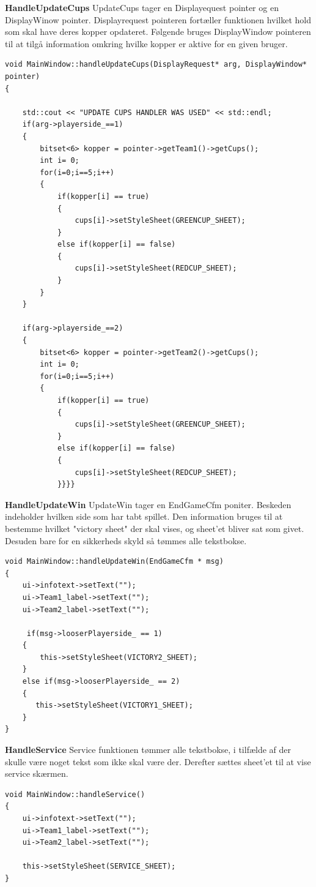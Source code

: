 \documentclass[Softwaredesign/Softwaredesign_main.tex]{subfiles}
\begin{document}
\textbf{HandleUpdateCups}
UpdateCups tager en Displayequest pointer og en DisplayWinow pointer. Displayrequest pointeren fortæller funktionen hvilket hold som skal have deres kopper opdateret. Følgende bruges DisplayWindow pointeren til at tilgå information omkring hvilke kopper er aktive for en given bruger. 
\begin{verbatim}
void MainWindow::handleUpdateCups(DisplayRequest* arg, DisplayWindow* pointer)
{

    std::cout << "UPDATE CUPS HANDLER WAS USED" << std::endl;
    if(arg->playerside_==1)
    {
        bitset<6> kopper = pointer->getTeam1()->getCups();
        int i= 0;
        for(i=0;i==5;i++)
        {
            if(kopper[i] == true)
            {
                cups[i]->setStyleSheet(GREENCUP_SHEET);
            }
            else if(kopper[i] == false)
            {
                cups[i]->setStyleSheet(REDCUP_SHEET);
            }
        }
    }

    if(arg->playerside_==2)
    {
        bitset<6> kopper = pointer->getTeam2()->getCups();
        int i= 0;
        for(i=0;i==5;i++)
        {
            if(kopper[i] == true)
            {
                cups[i]->setStyleSheet(GREENCUP_SHEET);
            }
            else if(kopper[i] == false)
            {
                cups[i]->setStyleSheet(REDCUP_SHEET);
            }}}}
\end{verbatim}


\textbf{HandleUpdateWin}
UpdateWin tager en EndGameCfm poniter. Beskeden indeholder hvilken side som har tabt spillet.  Den information bruges til at bestemme hvilket "victory sheet" der skal vises, og sheet'et bliver sat som givet. Desuden bare for en sikkerheds skyld så tømmes alle tekstbokse.
\begin{verbatim}
void MainWindow::handleUpdateWin(EndGameCfm * msg)
{
    ui->infotext->setText("");
    ui->Team1_label->setText("");
    ui->Team2_label->setText("");

     if(msg->looserPlayerside_ == 1)
    {
        this->setStyleSheet(VICTORY2_SHEET);
    }
    else if(msg->looserPlayerside_ == 2)
    {
       this->setStyleSheet(VICTORY1_SHEET);
    }
}
\end{verbatim}


\textbf{HandleService}
Service funktionen tømmer alle tekstbokse,  i tilfælde af der skulle være noget tekst som ikke skal være der.  Derefter sættes sheet'et til at vise service skærmen. 
\begin{verbatim}
void MainWindow::handleService()
{
    ui->infotext->setText("");
    ui->Team1_label->setText("");
    ui->Team2_label->setText("");

    this->setStyleSheet(SERVICE_SHEET);
}
\end{verbatim}
\end{document}
